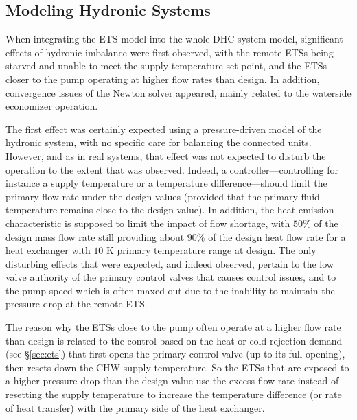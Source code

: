 \pagebreak
\begin{appendix}

    \section{Modeling Hydronic Systems} \label{sec:balancing}

When integrating the ETS model into the whole DHC system model, significant effects of hydronic imbalance were first observed, with the remote ETSs being starved and unable to meet the supply temperature set point, and the ETSs closer to the pump operating at higher flow rates than design.
In addition, convergence issues of the Newton solver appeared, mainly related to the waterside economizer operation.

The first effect was certainly expected using a pressure-driven model of the hydronic system, with no specific care for balancing the connected units. However, and as in real systems, that effect was not expected to disturb the operation to the extent that was observed. Indeed, a controller---controlling for instance a supply temperature or a temperature difference---should limit the primary flow rate under the design values (provided that the primary fluid temperature remains close to the design value). In addition, the heat emission characteristic is supposed to limit the impact of flow shortage, with $50\%$ of the design mass flow rate still providing about $90\%$ of the design heat flow rate for a heat exchanger with $10$ K primary temperature range at design. The only disturbing effects that were expected, and indeed observed, pertain to the low valve authority of the primary control valves that causes control issues, and to the pump speed which is often maxed-out due to the inability to maintain the pressure drop at the remote ETS.

The reason why the ETSs close to the pump often operate at a higher flow rate than design is related to the control based on the heat or cold rejection demand (see §\ref{sec:ets}) that first opens the primary control valve (up to its full opening), then resets down the CHW supply temperature. So the ETSs that are exposed to a higher pressure drop than the design value use the excess flow rate instead of resetting the supply temperature to increase the temperature difference (or rate of heat transfer) with the primary side of the heat exchanger.


\end{appendix}
